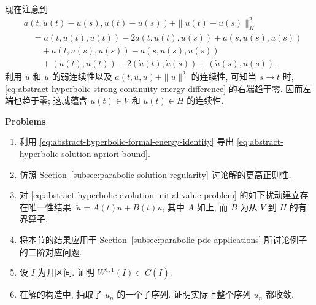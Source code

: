 现在注意到
\begin{equation}\label{eq:abstract-hyperbolic-strong-continuity-energy-difference}
\begin{aligned}
&a(t,u(t)-u(s),u(t)-u(s))+\|\dot u(t)-\dot u(s)\|_H^2\\
&\quad=a(t,u(t),u(t))-2a(t,u(t),u(s))+a(s,u(s),u(s))\\
&\qquad+a(t,u(s),u(s))-a(s,u(s),u(s))\\
&\qquad+(\dot u(t),\dot u(t))-2(\dot u(t),\dot u(s))+(\dot u(s),\dot u(s)).
\end{aligned}
\end{equation}
利用 $u$ 和 $\dot u$ 的弱连续性以及 $a(t,u,u)+\|\dot u\|^2$ 的连续性, 可知当 $s\to t$ 时, \eqref{eq:abstract-hyperbolic-strong-continuity-energy-difference} 的右端趋于零. 因而左端也趋于零; 这就蕴含 $u(t)\in V$ 和 $\dot u(t)\in H$ 的连续性.

\textbf{Problems}

\begin{enumerate}[label=\thesection.\arabic*.,ref=\thesection.\arabic*,start=6,series=book-problems]

\item\label{ex:hyperbolic-energy-apriori-estimate} 利用 \eqref{eq:abstract-hyperbolic-formal-energy-identity} 导出 \eqref{eq:abstract-hyperbolic-solution-apriori-bound}.

\item\label{ex:hyperbolic-higher-regularity-discussion} 仿照 Section~\ref{subsec:parabolic-solution-regularity} 讨论解的更高正则性.

\item\label{ex:hyperbolic-bounded-lower-order-perturbation} 对 \eqref{eq:abstract-hyperbolic-evolution-initial-value-problem} 的如下扰动建立存在唯一性结果: $\ddot u=A(t)u+B(t)u$, 其中 $A$ 如上, 而 $B$ 为从 $V$ 到 $H$ 的有界算子.

\item\label{ex:hyperbolic-second-order-pde-applications} 将本节的结果应用于 Section~\ref{subsec:parabolic-pde-applications} 所讨论例子的二阶对应问题.

\item\label{ex:wone-one-continuous-closed-interval} 设 $I$ 为开区间. 证明 $W^{1,1}(I)\subset C(\overline I)$.

\item\label{ex:hyperbolic-entire-galerkin-sequence-convergence} 在解的构造中, 抽取了 $u_n$ 的一个子序列. 证明实际上整个序列 $u_n$ 都收敛.

\end{enumerate}
